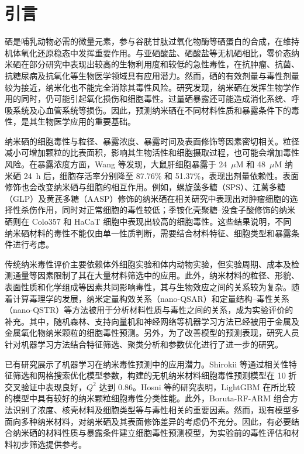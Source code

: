 \section{引言}

硒是哺乳动物必需的微量元素，参与谷胱甘肽过氧化物酶等硒蛋白的合成，在维持机体氧化还原稳态中发挥重要作用。与亚硒酸盐、硒酸盐等无机硒相比，零价态纳米硒在部分研究中表现出较高的生物利用度和较低的急性毒性，在抗肿瘤、抗菌、抗糖尿病及抗氧化等生物医学领域具有应用潜力\cite{hosnedlova2018nanoselenium,bisht2022senps,sowmya2024nanoselenium,karthik2024senps}。然而，硒的有效剂量与毒性剂量较为接近，纳米化也不能完全消除其毒性风险。研究发现，纳米硒在发挥生物学作用的同时，仍可能引起氧化损伤和细胞毒性\cite{wang2020prooxidation}。过量硒暴露还可能造成消化系统、呼吸系统及心血管系统等损伤\cite{hosnedlova2018nanoselenium}。因此，预测纳米硒在不同材料性质和暴露条件下的毒性，是其生物医学应用的重要基础。

纳米硒的细胞毒性与粒径、暴露浓度、暴露时间及表面修饰等因素密切相关。粒径减小可增加颗粒的比表面积，影响其生物活性和细胞摄取过程，也可能会增加毒性风险\cite{zhang2023senpsbio}。在暴露浓度方面，Wang 等\cite{wang2020prooxidation}发现，大鼠肝细胞暴露于 24~$\mu$M 和 48~$\mu$M 纳米硒 24~h 后，细胞存活率分别降至 87.76\% 和 51.37\%，表现出剂量依赖性。表面修饰也会改变纳米硒与细胞的相互作用。例如，螺旋藻多糖（SPS）、江蓠多糖（GLP）及黄芪多糖（AASP）修饰的纳米硒在相关研究中表现出对肿瘤细胞的选择性杀伤作用，同时对正常细胞的毒性较低\cite{zhang2023senpsbio,ji2023astragalus}；季铵化壳聚糖--没食子酸修饰的纳米硒则在 Colo357 和 HaCaT 细胞中表现出较高的细胞毒性\cite{lunkov2023chitosan}。这些结果说明，不同纳米硒材料的毒性不能仅由单一性质判断，需要结合材料特征、细胞类型和暴露条件进行考虑。

传统纳米毒性评价主要依赖体外细胞实验和体内动物实验，但实验周期、成本及检测通量等因素限制了其在大量材料筛选中的应用\cite{ahmadi2024toxicity}。此外，纳米材料的粒径、形貌、表面性质和化学组成等因素共同影响毒性，其与生物效应之间的关系较为复杂\cite{ji2025rosml}。随着计算毒理学的发展，纳米定量构效关系（nano-QSAR）和定量结构--毒性关系（nano-QSTR）等方法被用于分析材料性质与毒性之间的关系，成为实验评价的补充\cite{roy2023tio2}。其中，随机森林、支持向量机和神经网络等机器学习方法已经被用于金属及金属氧化物纳米颗粒的细胞毒性预测\cite{zhang2023qsar}。另外，为了改善模型的预测表现，研究人员针对机器学习方法结合特征筛选、聚类分析和参数优化进行了进一步的研究\cite{sang2022mlcytotoxicity}。

已有研究展示了机器学习在纳米毒性预测中的应用潜力。Shirokii 等通过相关性特征筛选和网格搜索优化模型参数，构建的无机纳米材料细胞毒性预测模型在 10 折交叉验证中表现良好，$Q^2$ 达到 0.86\cite{shirokii2023quantitative}。Hosni 等的研究表明，LightGBM 在所比较的模型中具有较好的纳米颗粒细胞毒性分类性能\cite{hosni2025mlnp}。此外，Boruta-RF-ARM 组合方法识别了浓度、核壳材料及细胞类型等与毒性相关的重要因素\cite{yildirim2025rheumatoid}。然而，现有模型多面向多种纳米材料，对纳米硒及其表面修饰差异的考虑仍不充分。因此，有必要结合纳米硒的材料性质与暴露条件建立细胞毒性预测模型，为实验前的毒性评估和材料初步筛选提供参考。


